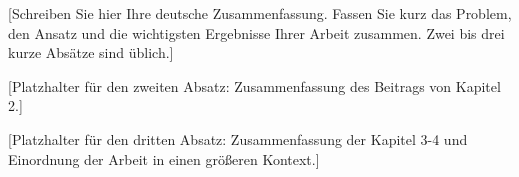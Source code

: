 [Schreiben Sie hier Ihre deutsche Zusammenfassung. Fassen Sie kurz das
Problem, den Ansatz und die wichtigsten Ergebnisse Ihrer Arbeit zusammen.
Zwei bis drei kurze Absätze sind üblich.]

[Platzhalter für den zweiten Absatz: Zusammenfassung des Beitrags von
Kapitel 2.]

[Platzhalter für den dritten Absatz: Zusammenfassung der Kapitel 3-4 und
Einordnung der Arbeit in einen größeren Kontext.]
